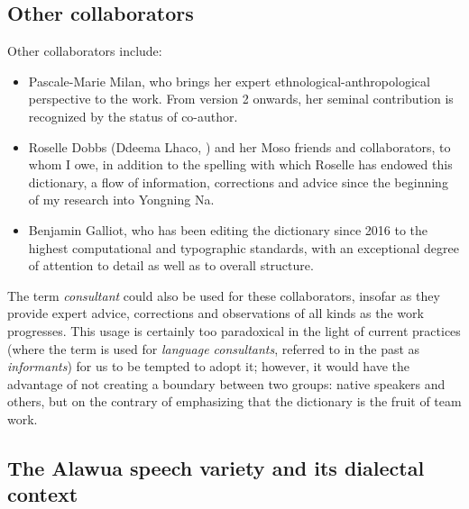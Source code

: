 \subsection{Other collaborators}

Other collaborators include:

\begin{itemize}
    \item Pascale-Marie Milan, who brings her expert ethnological-anthropological perspective to the work. From version 2 onwards, her seminal contribution is recognized by the status of co-author.
    \item Roselle Dobbs (Ddeema Lhaco, ) and her Moso friends and collaborators, to whom I owe, in addition to the spelling with which Roselle has endowed this dictionary, a flow of information, corrections and advice since the beginning of my research into Yongning Na.
    \item Benjamin Galliot, who has been editing the dictionary since 2016 to the highest computational and typographic standards, with an exceptional degree of attention to detail as well as to overall structure.
\end{itemize}

The term \emph{consultant} could also be used for these collaborators, insofar as they provide expert advice, corrections and observations of all kinds as the work progresses. This usage is certainly too paradoxical in the light of current practices (where the term is used for \emph{language consultants}, referred to in the past as \emph{informants}) for us to be tempted to adopt it; however, it would have the advantage of not creating a boundary between two groups: native speakers and others, but on the contrary of emphasizing that the dictionary is the fruit of team work.

\subsection{The Alawua speech variety and its dialectal context}

